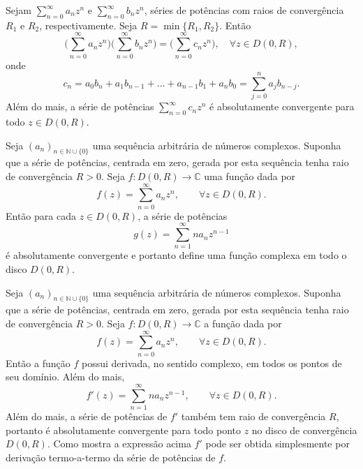 


\begin{proposicao}
Sejam $\sum_{n=0}^{\infty}a_nz^n$ e $\sum_{n=0}^{\infty}b_nz^n$,
séries de potências com raios de convergência $R_1$ e $R_2$, respectivamente.
Seja $R=\min\{R_1,R_2\}$. Então 
\[
\Big(\sum_{n=0}^{\infty}a_nz^n\Big)\Big(\sum_{n=0}^{\infty}b_nz^n\Big)
=
\Big(\sum_{n=0}^{\infty}c_nz^n\Big),
\quad \forall z\in D(0,R),
\]
onde 
\[
c_n = a_0b_n+a_1b_{n-1}+\ldots+a_{n-1}b_{1}+a_{n}b_0 = \sum_{j=0}^n a_{j}b_{n-j}.
\]
Além do mais, a série de potências $\sum_{n=0}^{\infty}c_nz^n$ é absolutamente convergente
para todo $z\in D(0,R)$.
\end{proposicao}




\begin{proposicao}
Seja $(a_n)_{n\in\mathbb{N}\cup\{0\}}$ uma sequência arbitrária de números complexos.
Suponha que a série de potências, centrada em zero, gerada por esta sequência tenha raio de convergência $R>0$. 
Seja $f:D(0,R)\to\mathbb{C}$ uma função dada por
\[
f(z) = \sum_{n=0}^{\infty}a_nz^n, \qquad \forall z\in D(0,R).
\]
Então para cada $z\in D(0,R)$, a série de potências
\[
g(z) = \sum_{n=1}^{\infty}na_nz^{n-1}
\] 
é absolutamente convergente e portanto
define uma função complexa em todo o disco $D(0,R)$.
\end{proposicao}


\begin{teorema}
Seja $(a_n)_{n\in\mathbb{N}\cup\{0\}}$ uma sequência arbitrária de números complexos.
Suponha que a série de potências, centrada em zero, gerada por esta sequência tenha raio de convergência $R>0$. 
Seja $f:D(0,R)\to\mathbb{C}$ a função dada por
\[
f(z) = \sum_{n=0}^{\infty}a_nz^n, \qquad \forall z\in D(0,R).
\]
Então a função $f$ possui derivada, no sentido complexo, em todos os 
pontos de seu domínio. Além do mais, 
\[
f'(z) = \sum_{n=1}^{\infty}na_nz^{n-1}, \qquad\forall z\in D(0,R).
\]
Além do mais, a série de potências de $f'$ também tem raio de convergência $R$,
portanto é absolutamente convergente para todo ponto $z$ no 
disco de convergência $D(0,R)$. Como mostra a expressão acima 
$f'$ pode ser obtida simplesmente 
por derivação termo-a-termo da série de potências de $f$.
\end{teorema}

